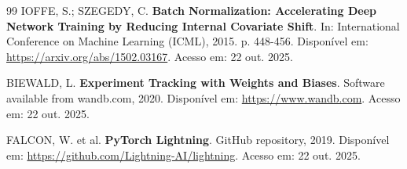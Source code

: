\documentclass[12pt, a4paper]{article}
\begin{document}
\begin{thebibliography}{99}
IOFFE, S.; SZEGEDY, C. \textbf{Batch Normalization: Accelerating Deep Network Training by Reducing Internal Covariate Shift}. In: International Conference on Machine Learning (ICML), 2015. p. 448-456. Disponível em: \url{https://arxiv.org/abs/1502.03167}. Acesso em: 22 out. 2025.

BIEWALD, L. \textbf{Experiment Tracking with Weights and Biases}. Software available from wandb.com, 2020. Disponível em: \url{https://www.wandb.com}. Acesso em: 22 out. 2025.

FALCON, W. et al. \textbf{PyTorch Lightning}. GitHub repository, 2019. Disponível em: \url{https://github.com/Lightning-AI/lightning}. Acesso em: 22 out. 2025.

\end{thebibliography}
\end{document}
